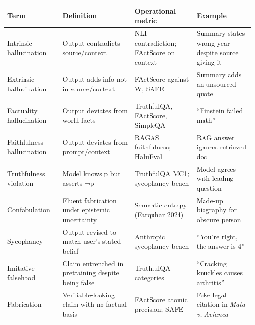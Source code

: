 {\def\LTcaptype{none} %
\begin{longtable}[]{@{}
  >{\raggedright\arraybackslash}p{}
  >{\raggedright\arraybackslash}p{}
  >{\raggedright\arraybackslash}p{}
  >{\raggedright\arraybackslash}p{}@{}}
\toprule\noalign{}
\begin{minipage}[b]{\linewidth}\raggedright
Term
\end{minipage} & \begin{minipage}[b]{\linewidth}\raggedright
Definition
\end{minipage} & \begin{minipage}[b]{\linewidth}\raggedright
Operational metric
\end{minipage} & \begin{minipage}[b]{\linewidth}\raggedright
Example
\end{minipage} \\
\midrule\noalign{}
\endhead
\bottomrule\noalign{}
\endlastfoot
Intrinsic hallucination & Output contradicts source/context & NLI contradiction; FActScore on context & Summary states wrong year despite source giving it \\
Extrinsic hallucination & Output adds info not in source/context & FActScore against W; SAFE & Summary adds an unsourced quote \\
Factuality hallucination & Output deviates from world facts & TruthfulQA, FActScore, SimpleQA & ``Einstein failed math'' \\
Faithfulness hallucination & Output deviates from prompt/context & RAGAS faithfulness; HaluEval & RAG answer ignores retrieved doc \\
Truthfulness violation & Model knows p but asserts ¬p & TruthfulQA MC1; sycophancy bench & Model agrees with leading question \\
Confabulation & Fluent fabrication under epistemic uncertainty & Semantic entropy (Farquhar 2024) & Made-up biography for obscure person \\
Sycophancy & Output revised to match user's stated belief & Anthropic sycophancy bench & ``You're right, the answer is 4'' \\
Imitative falsehood & Claim entrenched in pretraining despite being false & TruthfulQA categories & ``Cracking knuckles causes arthritis'' \\
Fabrication & Verifiable-looking claim with no factual basis & FActScore atomic precision; SAFE & Fake legal citation in \emph{Mata v. Avianca} \\
\end{longtable}
}

